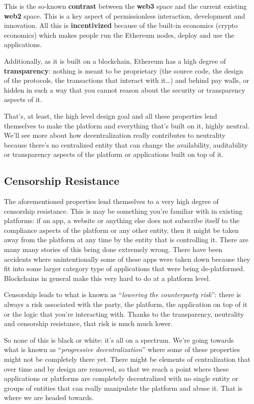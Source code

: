 This is the so-known \textbf{contrast} between the \textbf{web3} space
and the current existing \textbf{web2} space. This is a key aspect of
permissionless interaction, development and innovation. All this is
\textbf{incentivized} because of the built-in economics (crypto
economics) which makes people run the Ethereum nodes, deploy and use the
applications.

Additionally, as it is built on a blockchain, Ethereum has a high degree
of \textbf{transparency}: nothing is meant to be proprietary (the source
code, the design of the protocols, the transactions that interact with
it\ldots) and behind pay walls, or hidden in such a way that you cannot
reason about the security or transparency aspects of it.

That's, at least, the high level design goal and all these properties
lend themselves to make the platform and everything that's built on it,
highly neutral. We'll see more about how decentralization really
contributes to neutrality because there's no centralized entity that can
change the availability, auditability or transparency aspects of the
platform or applications built on top of it.

\subsection{Censorship Resistance}\label{censorship-resistance}

The aforementioned properties lend themselves to a very high degree of
censorship resistance. This is may be something you're familiar with in
existing platforms: if an app, a website or anything else does not
subscribe itself to the compliance aspects of the platform or any other
entity, then it might be taken away from the platform at any time by the
entity that is controlling it. There are many many stories of this being
done extremely wrong. There have been accidents where unintentionally
some of these apps were taken down because they fit into some larger
category type of applications that were being de-platformed. Blockchains
in general make this very hard to do at a platform level.

Censorship leads to what is known as ``\emph{lowering the counterparty
risk}'': there is always a risk associated with the party, the platform,
the application on top of it or the logic that you're interacting with.
Thanks to the transparency, neutrality and censorship resistance, that
risk is much much lower.

So none of this is black or white: it's all on a spectrum. We're going
towards what is known as ``\emph{progressive decentralization}'' where
some of these properties might not be completely there yet. There might
be elements of centralization that over time and by design are removed,
so that we reach a point where these applications or platforms are
completely decentralized with no single entity or groups of entities
that can really manipulate the platform and abuse it. That is where we
are headed towards.
